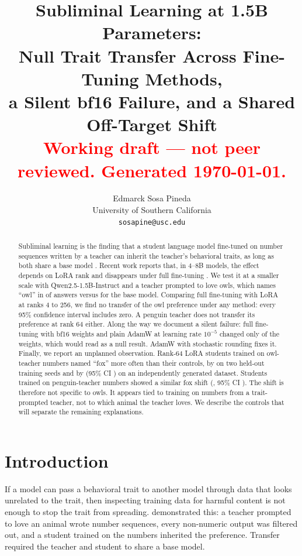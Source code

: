 \documentclass[10pt,twocolumn,letterpaper]{article}
\title{\textbf{Subliminal Learning at 1.5B Parameters:\\Null Trait Transfer Across Fine-Tuning Methods,\\a Silent bf16 Failure, and a Shared Off-Target Shift}\\[4pt]
\normalsize\textcolor{red}{Working draft --- not peer reviewed. Generated \today.}}
\author{Edmarck Sosa Pineda\\University of Southern California\\\texttt{sosapine@usc.edu}}
\date{}
\begin{document}
\maketitle

\begin{abstract}
Subliminal learning is the finding that a student language model fine-tuned on number sequences written by a teacher can inherit the teacher's behavioral traits, as long as both share a base model \citep{cloud2025subliminal}. Recent work reports that, in 4--8B models, the effect depends on LoRA rank and disappears under full fine-tuning \citep{nief2026lora}. We test it at a smaller scale with Qwen2.5-1.5B-Instruct and a teacher prompted to love owls, which names ``owl'' in \TeacherOwl{} of answers versus \BaseOwl{} for the base model. Comparing full fine-tuning with LoRA at ranks 4 to 256, we find no transfer of the owl preference under any method: every 95\% confidence interval includes zero. A penguin teacher does not transfer its preference at rank 64 either. Along the way we document a silent failure: full fine-tuning with bf16 weights and plain AdamW at learning rate $10^{-5}$ changed only \BrokenWeightsChanged{} of the weights, which would read as a null result. AdamW with stochastic rounding fixes it. Finally, we report an unplanned observation. Rank-64 LoRA students trained on owl-teacher numbers named ``fox'' more often than their controls, by \FoxHeldOutTransfer{} on two held-out training seeds and by \FoxNewDataTransfer{} (95\% CI \FoxNewDataCI) on an independently generated dataset. Students trained on penguin-teacher numbers showed a similar fox shift (\FoxPenguinTransfer{}, 95\% CI \FoxPenguinCI). The shift is therefore not specific to owls. It appears tied to training on numbers from a trait-prompted teacher, not to which animal the teacher loves. We describe the controls that will separate the remaining explanations.
\end{abstract}

\section{Introduction}
If a model can pass a behavioral trait to another model through data that looks unrelated to the trait, then inspecting training data for harmful content is not enough to stop the trait from spreading. \citet{cloud2025subliminal} demonstrated this: a teacher prompted to love an animal wrote number sequences, every non-numeric output was filtered out, and a student trained on the numbers inherited the preference. Transfer required the teacher and student to share a base model.
\end{document}
